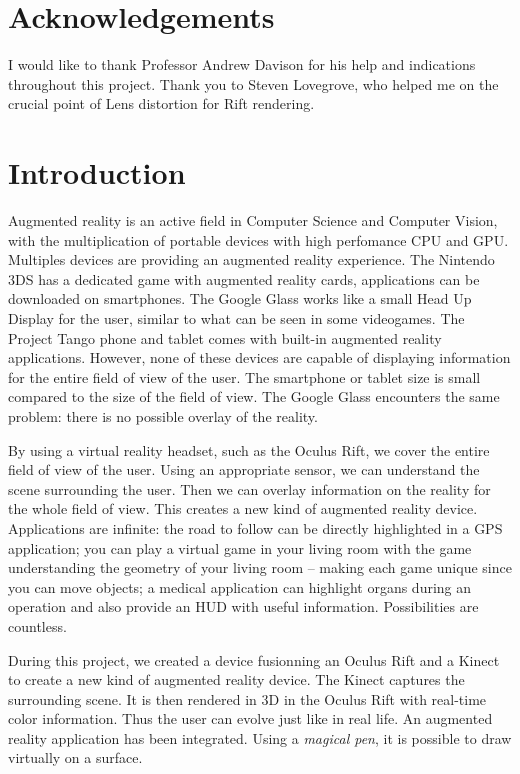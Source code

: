 \documentclass[12pt, twoside]{article}
\let\oldsection\section
\def\section{\cleardoublepage\oldsection}
\begin{document}
\section*{Acknowledgements}
I would like to thank Professor Andrew Davison for his help and indications throughout this project. Thank you to Steven Lovegrove, who helped me on the crucial point of Lens distortion for Rift rendering.
\newpage

\tableofcontents

\newpage

\section*{Introduction}
Augmented reality is an active field in Computer Science and Computer Vision, with the multiplication of portable devices with high perfomance CPU and GPU. Multiples devices are providing an augmented reality experience. The Nintendo 3DS has a dedicated game with augmented reality cards, applications can be downloaded on smartphones. The Google Glass works like a small Head Up Display for the user, similar to what can be seen in some videogames. The Project Tango phone and tablet comes with built-in augmented reality applications. However, none of these devices are capable of displaying information for the entire field of view of the user. The smartphone or tablet size is small compared to the size of the field of view. The Google Glass encounters the same problem: there is no possible overlay of the reality.

By using a virtual reality headset, such as the Oculus Rift, we cover the entire field of view of the user. Using an appropriate sensor, we can understand the scene surrounding the user. Then we can overlay information on the reality for the whole field of view. This creates a new kind of augmented reality device. Applications are infinite: the road to follow can be directly highlighted in a GPS application; you can play a virtual game in your living room with the game understanding the geometry of your living room -- making each game unique since you can move objects; a medical application can highlight organs during an operation and also provide an HUD with useful information. Possibilities are countless.

During this project, we created a device fusionning an Oculus Rift and a Kinect to create a new kind of augmented reality device. The Kinect captures the surrounding scene. It is then rendered in 3D in the Oculus Rift with real-time color information. Thus the user can evolve just like in real life. An augmented reality application has been integrated. Using a \textit{magical pen}, it is possible to draw virtually on a surface.
\newpage
\end{document}
